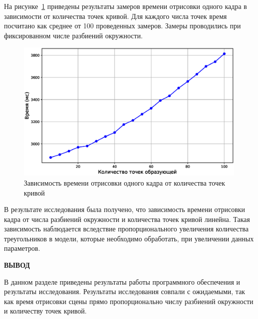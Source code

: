 На рисунке~\ref{fig:curve} приведены  результаты замеров времени отрисовки одного кадра в зависимости от количества точек кривой. Для каждого числа точек время посчитано как среднее от 100 проведенных замеров. Замеры проводились при фиксированном числе разбиений окружности.

\begin{figure}[H]
	\centering
	\includegraphics[scale=0.6]{img/graph_curve.eps}
	\caption{Зависимость времени отрисовки одного кадра от количества точек кривой}
	\label{fig:curve}
\end{figure}

В результате исследования была получено, что зависимость времени отрисовки кадра от числа разбиений окружности и количества точек кривой линейна. Такая зависимость наблюдается вследствие пропорционального увеличения количества треугольников в модели, которые необходимо обработать, при увеличении данных параметров.


\textbf{ВЫВОД}

В данном разделе приведены результаты работы программного обеспечения и результаты исследования. Результаты исследования совпали с ожидаемыми, так как время отрисовки сцены прямо пропорционально числу разбиений окружности и количеству точек кривой. 
\clearpage